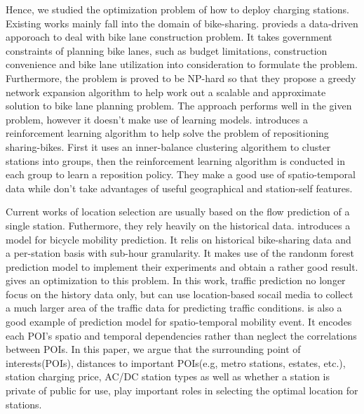 Hence, we studied the optimization problem of how to deploy charging stations. Existing works mainly fall into the domain of bike-sharing. \cite{Bao:2017} provieds a data-driven apporoach to deal with bike lane construction problem. It takes government constraints of planning bike lanes, such as budget limitations, construction convenience and bike lane utilization into consideration to formulate the problem. Furthermore, the problem is proved to be NP-hard so that they propose a greedy network expansion algorithm to help work out a scalable and approximate solution to bike lane planning problem. The approach performs well in the given problem, however it doesn't make use of learning models. \cite{Li:2018:DBR} introduces a reinforcement learning algorithm to help solve the problem of repositioning sharing-bikes. First it uses an inner-balance clustering algorithem to cluster stations into groups, then the reinforcement learning algorithm is conducted in each group to learn a reposition policy. They make a good use of spatio-temporal data while don't take advantages of useful geographical and station-self features. 

Current works of location selection are usually based on the flow prediction of a single station. Futhermore, they rely heavily on the historical data. \cite{Yang:2016:MMP} introduces a model for bicycle mobility prediction. It relis on historical bike-sharing data and a per-station basis with sub-hour granularity. It makes use of the randonm forest prediction model to implement their experiments and obtain a rather good result. \cite{Liu:2016:CTP} gives an optimization to this problem. In this work, traffic prediction no longer focus on the history data only, but can use location-based socail media to collect a much larger area of the traffic data for predicting traffic conditions. \cite{Shen:2018:SNS} is also a good example of prediction model for spatio-temporal mobility event. It encodes each POI's spatio and temporal dependencies rather than neglect the correlations between POIs. In this paper, we argue that the surrounding point of interests(POIs), distances to important POIs(e.g, metro stations, estates, etc.), station charging price, AC/DC station types as well as whether a station is private of public for use, play important roles in selecting the optimal location for stations.